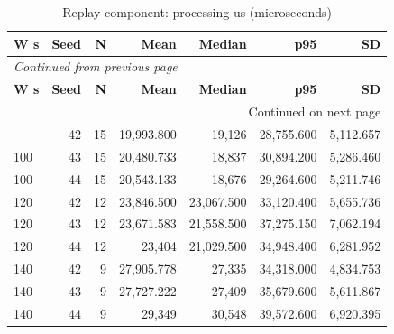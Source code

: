\documentclass[10pt,a4paper]{article}
\begin{document}
\begin{longtable}{@{}lrrrrrr@{}}
\caption{Replay component:\allowbreak{} processing us (microseconds)}\\
\toprule
\textbf{W s} & \textbf{Seed} & \textbf{N} & \textbf{Mean} & \textbf{Median} & \textbf{p95} & \textbf{SD} \\
\midrule\endfirsthead
\multicolumn{7}{l}{\small\itshape Continued from previous page}\\
\toprule
\textbf{W s} & \textbf{Seed} & \textbf{N} & \textbf{Mean} & \textbf{Median} & \textbf{p95} & \textbf{SD} \\
\midrule\endhead
\midrule\multicolumn{7}{r}{\small Continued on next page}\\\endfoot
\bottomrule\endlastfoot
100 & 42 & 15 & 19,993.800 & 19,126 & 28,755.600 & 5,112.657 \\
100 & 43 & 15 & 20,480.733 & 18,837 & 30,894.200 & 5,286.460 \\
100 & 44 & 15 & 20,543.133 & 18,676 & 29,264.600 & 5,211.746 \\
120 & 42 & 12 & 23,846.500 & 23,067.500 & 33,120.400 & 5,655.736 \\
120 & 43 & 12 & 23,671.583 & 21,558.500 & 37,275.150 & 7,062.194 \\
120 & 44 & 12 & 23,404 & 21,029.500 & 34,948.400 & 6,281.952 \\
140 & 42 & 9 & 27,905.778 & 27,335 & 34,318.000 & 4,834.753 \\
140 & 43 & 9 & 27,727.222 & 27,409 & 35,679.600 & 5,611.867 \\
140 & 44 & 9 & 29,349 & 30,548 & 39,572.600 & 6,920.395 \\
\end{longtable}\endgroup
\begingroup\small\setlength{\tabcolsep}{4pt}\renewcommand{\arraystretch}{1.12}
\end{document}
